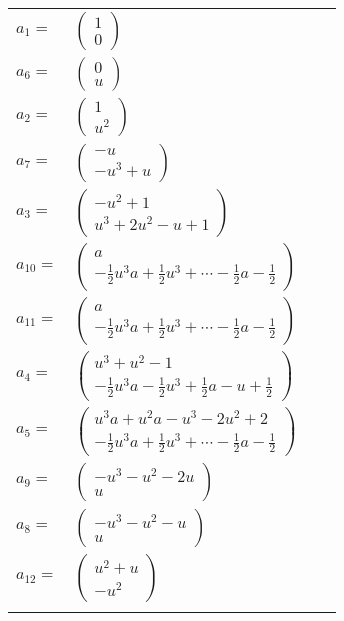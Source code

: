 \documentclass[1p]{elsarticle_modified}
\theoremstyle{definition}
\begin{document}
\begin{tabular}{m{7pt} m{180pt} m{7pt} m{180pt} }
\flushright $a_{1}=$&$\begin{pmatrix}1\\0\end{pmatrix}$ \\
\flushright $a_{6}=$&$\begin{pmatrix}0\\u\end{pmatrix}$ \\
\flushright $a_{2}=$&$\begin{pmatrix}1\\u^2\end{pmatrix}$ \\
\flushright $a_{7}=$&$\begin{pmatrix}- u\\- u^3+u\end{pmatrix}$ \\
\flushright $a_{3}=$&$\begin{pmatrix}- u^2+1\\u^3+2 u^2- u+1\end{pmatrix}$ \\
\flushright $a_{10}=$&$\begin{pmatrix}a\\-\frac{1}{2} u^3 a+\frac{1}{2} u^3+\cdots-\frac{1}{2} a-\frac{1}{2}\end{pmatrix}$ \\
\flushright $a_{11}=$&$\begin{pmatrix}a\\-\frac{1}{2} u^3 a+\frac{1}{2} u^3+\cdots-\frac{1}{2} a-\frac{1}{2}\end{pmatrix}$ \\
\flushright $a_{4}=$&$\begin{pmatrix}u^3+u^2-1\\-\frac{1}{2} u^3 a-\frac{1}{2} u^3+\frac{1}{2} a- u+\frac{1}{2}\end{pmatrix}$ \\
\flushright $a_{5}=$&$\begin{pmatrix}u^3 a+u^2 a- u^3-2 u^2+2\\-\frac{1}{2} u^3 a+\frac{1}{2} u^3+\cdots-\frac{1}{2} a-\frac{1}{2}\end{pmatrix}$ \\
\flushright $a_{9}=$&$\begin{pmatrix}- u^3- u^2-2 u\\u\end{pmatrix}$ \\
\flushright $a_{8}=$&$\begin{pmatrix}- u^3- u^2- u\\u\end{pmatrix}$ \\
\flushright $a_{12}=$&$\begin{pmatrix}u^2+u\\- u^2\end{pmatrix}$\\&\end{tabular}
\end{document}
